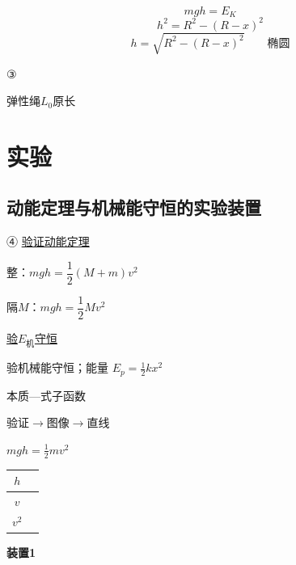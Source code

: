 \[ mgh=E_K \]
\[ h^2=R^2-(R-x)^2 \]
\[ h=\sqrt{R^2-(R-x)^2}\qquad\text{椭圆} \]

③

弹性绳\quad $L_0$原长




\section{实验}
\subsection{动能定理与机械能守恒的实验装置}
④ \underline{验证动能定理}

整：$mgh=\dfrac{1}{2}(M+m)v^2$\quad {}

隔$M$：$mgh=\dfrac{1}{2}Mv^2$\quad {}


 \underline{验$E_{\text{机}}$守恒} %

验机械能守恒；能量 $E_p=\frac{1}{2}kx^2$

\hspace{2em}本质—式子函数

\hspace{2em}验证$\to$图像$\to$直线

$mgh=\frac{1}{2}mv^2$


\begin{center}
\begin{tabular}{|c|p{6cm}|}
\hline
$h$ & \\
\hline
$v$ & \\
\hline
$v^2$ & \\
\hline
\end{tabular}
\end{center}

\textbf{装置1}


